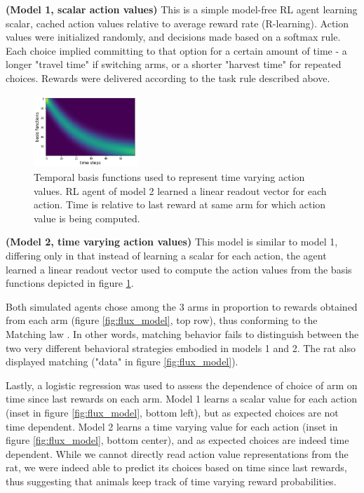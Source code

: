 \textbf{(Model 1, scalar action values)}
This is a simple model-free RL agent learning scalar, cached action values relative to average reward rate (R-learning).
Action values were initialized randomly, and decisions made based on a softmax rule.
Each choice implied committing to that option for a certain amount of time - a longer "travel time" if switching arms, or a shorter "harvest time" for repeated choices.
Rewards were delivered according to the task rule described above.

\begin{figure}%
    \centering
    \includegraphics[width=0.35\textwidth]{flux/microStimuli.png}%
    \caption{Temporal basis functions used to represent time varying action values. RL agent of model 2 learned a linear readout vector for each action. Time is relative to last reward at same arm for which action value is being computed.}
    \label{fig:basisFun}%
\end{figure}

\textbf{(Model 2, time varying action values)}
This model is similar to model 1, differing only in that instead of learning a scalar for each action, the agent learned a linear readout vector used to compute the action values from the basis functions depicted in figure \ref{fig:basisFun}.

Both simulated agents chose among the 3 arms in proportion to rewards obtained from each arm (figure \ref{fig:flux_model}, top row), thus conforming to the Matching law \cite{herrnstein1961relative}.
In other words, matching behavior fails to distinguish between the two very different behavioral strategies embodied in models 1 and 2.
The rat also displayed matching ("data" in figure \ref{fig:flux_model}).

Lastly, a logistic regression was used to assess the dependence of choice of arm on time since last rewards on each arm.
Model 1 learns a scalar value for each action (inset in figure \ref{fig:flux_model}, bottom left), but as expected choices are not time dependent.
Model 2 learns a time varying value for each action (inset in figure \ref{fig:flux_model}, bottom center), and as expected choices are indeed time dependent.
While we cannot directly read action value representations from the rat, we were indeed able to predict its choices based on time since last rewards, thus suggesting that animals keep track of time varying reward probabilities.

